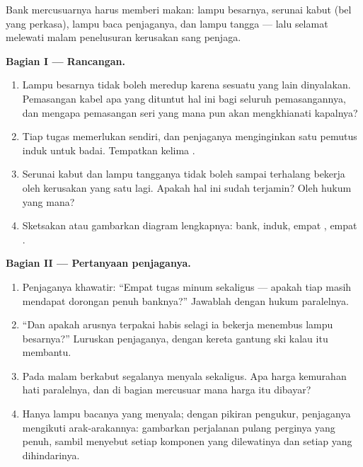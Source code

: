 \begin{problem}\label{pb:g7:circuits-series-parallel:1}
Bank  mercusuarnya harus memberi makan: lampu besarnya,
serunai kabut (bel yang perkasa), lampu baca penjaganya, dan lampu
tangga --- lalu selamat melewati malam penelusuran kerusakan sang
penjaga.

\medskip\noindent\textbf{Bagian I --- Rancangan.}
\begin{enumerate}
  \item Lampu besarnya tidak boleh meredup karena sesuatu yang lain
        dinyalakan. Pemasangan kabel apa yang dituntut hal ini bagi
        seluruh pemasangannya, dan mengapa pemasangan seri yang mana
        pun akan mengkhianati kapalnya?
  \item Tiap tugas memerlukan  sendiri, dan penjaganya
        menginginkan satu pemutus induk untuk  badai. Tempatkan
        kelima .
  \item Serunai kabut dan lampu tangganya tidak boleh sampai
        terhalang bekerja oleh kerusakan yang satu lagi. Apakah hal
        ini sudah terjamin? Oleh hukum yang mana?
  \item Sketsakan atau gambarkan diagram lengkapnya: bank, 
        induk, empat , empat  .
\end{enumerate}

\medskip\noindent\textbf{Bagian II --- Pertanyaan penjaganya.}
\begin{enumerate}[resume]
  \item Penjaganya khawatir: ``Empat tugas minum sekaligus ---
        apakah tiap  masih mendapat dorongan penuh banknya?''
        Jawablah dengan hukum paralelnya.
  \item ``Dan apakah arusnya terpakai habis selagi ia bekerja
        menembus lampu besarnya?'' Luruskan penjaganya, dengan kereta
        gantung ski kalau itu membantu.
  \item Pada malam berkabut segalanya menyala sekaligus. Apa harga
        kemurahan hati paralelnya, dan di bagian mercusuar mana harga
        itu dibayar?
  \item Hanya lampu bacanya yang menyala; dengan pikiran pengukur,
        penjaganya mengikuti arak-arakannya: gambarkan perjalanan
        pulang perginya yang penuh, sambil menyebut setiap komponen
        yang dilewatinya dan setiap yang dihindarinya.
\end{enumerate}


\end{problem}
